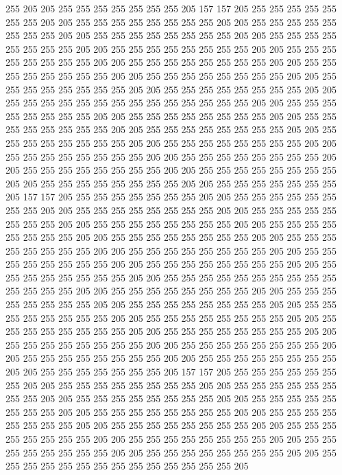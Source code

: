 255 205 205 255 255 255 255 255 255 255 205 157 157 205 255 255 255 255 255 255
255 205 205 255 255 255 255 255 255 255 255 205 205 255 255 255 255 255 255 255
255 205 205 255 255 255 255 255 255 255 255 205 205 255 255 255 255 255 255 255
255 205 205 255 255 255 255 255 255 255 255 205 205 255 255 255 255 255 255 255
255 205 205 255 255 255 255 255 255 255 255 205 205 255 255 255 255 255 255 255
255 205 205 255 255 255 255 255 255 255 255 205 205 255 255 255 255 255 255 255
255 205 205 255 255 255 255 255 255 255 255 205 205 255 255 255 255 255 255 255
255 255 255 255 255 255 255 205 205 255 255 255 255 255 255 255 255 205 205 255
255 255 255 255 255 255 255 205 205 255 255 255 255 255 255 255 255 205 205 255
255 255 255 255 255 255 255 205 205 255 255 255 255 255 255 255 255 205 205 255
255 255 255 255 255 255 255 205 205 255 255 255 255 255 255 255 255 205 205 255
255 255 255 255 255 255 255 205 205 255 255 255 255 255 255 255 255 205 205 255
255 255 255 255 255 255 255 205 205 255 255 255 255 255 255 255 255 205 205 255
255 255 255 255 255 255 205 157 157 205 255 255 255 255 255 255 255 205 205 255
255 255 255 255 255 255 255 205 205 255 255 255 255 255 255 255 255 205 205 255
255 255 255 255 255 255 255 205 205 255 255 255 255 255 255 255 255 205 205 255
255 255 255 255 255 255 255 205 205 255 255 255 255 255 255 255 255 205 205 255
255 255 255 255 255 255 255 205 205 255 255 255 255 255 255 255 255 205 205 255
255 255 255 255 255 255 255 205 205 255 255 255 255 255 255 255 255 205 205 255
255 255 255 255 255 255 255 205 205 255 255 255 255 255 255 255 255 255 255 255
255 255 255 205 205 255 255 255 255 255 255 255 255 205 205 255 255 255 255 255
255 255 255 205 205 255 255 255 255 255 255 255 255 205 205 255 255 255 255 255
255 255 255 205 205 255 255 255 255 255 255 255 255 205 205 255 255 255 255 255
255 255 255 205 205 255 255 255 255 255 255 255 255 205 205 255 255 255 255 255
255 255 255 205 205 255 255 255 255 255 255 255 255 205 205 255 255 255 255 255
255 255 255 205 205 255 255 255 255 255 255 255 255 205 205 255 255 255 255 255
255 255 205 157 157 205 255 255 255 255 255 255 255 205 205 255 255 255 255 255
255 255 255 205 205 255 255 255 255 255 255 255 255 205 205 255 255 255 255 255
255 255 255 205 205 255 255 255 255 255 255 255 255 205 205 255 255 255 255 255
255 255 255 205 205 255 255 255 255 255 255 255 255 205 205 255 255 255 255 255
255 255 255 205 205 255 255 255 255 255 255 255 255 205 205 255 255 255 255 255
255 255 255 205 205 255 255 255 255 255 255 255 255 205 205 255 255 255 255 255
255 255 255 205 205 255 255 255 255 255 255 255 255 255 255 255 255 255 255 205
